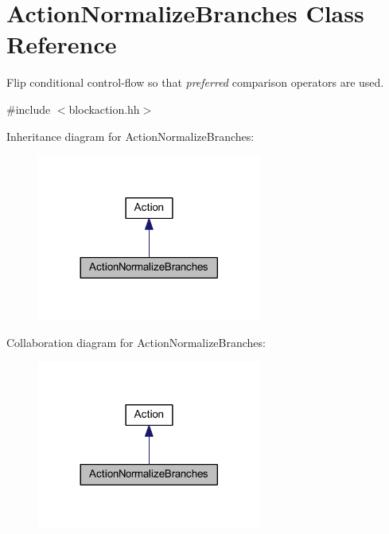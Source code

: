 \hypertarget{class_action_normalize_branches}{}\section{Action\+Normalize\+Branches Class Reference}
\label{class_action_normalize_branches}


Flip conditional control-\/flow so that {\itshape preferred} comparison operators are used.  




{\ttfamily \#include $<$blockaction.\+hh$>$}



Inheritance diagram for Action\+Normalize\+Branches\+:
\nopagebreak
\begin{figure}[H]
\begin{center}
\leavevmode
\includegraphics[width=209pt]{class_action_normalize_branches__inherit__graph}
\end{center}
\end{figure}


Collaboration diagram for Action\+Normalize\+Branches\+:
\nopagebreak
\begin{figure}[H]
\begin{center}
\leavevmode
\includegraphics[width=209pt]{class_action_normalize_branches__coll__graph}
\end{center}
\end{figure}
